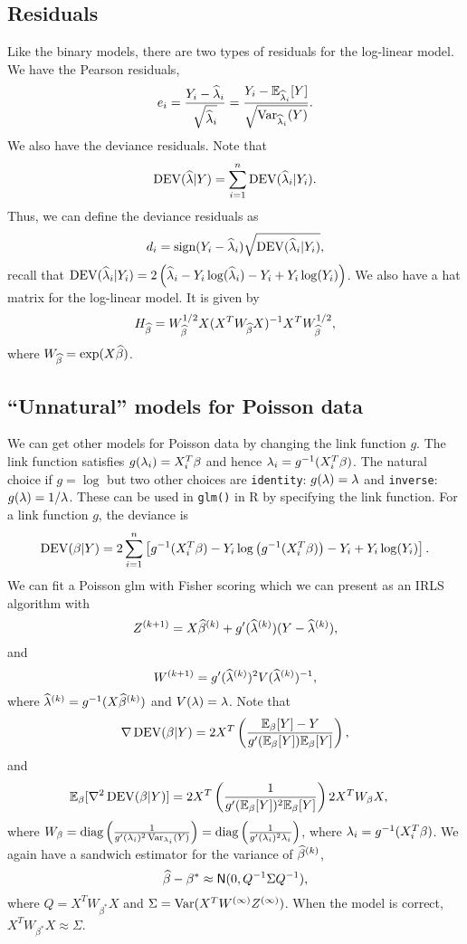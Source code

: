 {\subsection{Residuals}
Like the binary models, there are two types of residuals for the log-linear model. We have the Pearson residuals,
\[e_i = \frac{Y_i-\widehat{\lambda}_i}{\sqrt{\widehat{\lambda}_i}} = \frac{Y_i - {\mathbb{E}}_{\widehat{\lambda}_i}[Y]}{\sqrt{\operatorname{Var}_{\widehat{\lambda}_i}(Y)}}. \]
We also have the deviance residuals. Note that
\[\operatorname{DEV}(\widehat{\lambda}|Y) = \sum_{i=1}^n \operatorname{DEV}(\widehat{\lambda}_i|Y_i). \]
Thus, we can define the deviance residuals as 
\[d_i = \text{sign}(Y_i - \widehat{\lambda}_i)\sqrt{\operatorname{DEV}(\widehat{\lambda}_i|Y_i)}, \]
recall that $\operatorname{DEV}(\widehat{\lambda}_i|Y_i) = 2\left(\widehat{\lambda}_i-Y_i\log(\widehat{\lambda}_i)-Y_i+Y_i\log(Y_i)\right)$. We also have a hat matrix for the log-linear model. It is given by
\[H_{\widehat{\beta}} = W_{\widehat{\beta}}^{1/2}X(X^TW_{\widehat{\beta}}X)^{-1}X^TW_{\widehat{\beta}}^{1/2}, \]
where $W_{\widehat{\beta}}=\exp(X\widehat{\beta})$.
\subsection{``Unnatural'' models for Poisson data}
We can get other models for Poisson data by changing the link function $g$. The link function satisfies $g(\lambda_i) = X_i^T\beta$ and hence $\lambda_i = g^{-1}(X_i^T\beta)$. The natural choice if $g = \log$ but two other choices are \texttt{identity}: $g(\lambda) = \lambda$ and \texttt{inverse}: $g(\lambda) = 1/\lambda$. These can be used in \texttt{glm()} in R by specifying the link function. For a link function $g$, the deviance is
\[\operatorname{DEV}(\beta|Y) = 2\sum_{i=1}^n \left[g^{-1}(X_i^T\beta)-Y_i\log\left(g^{-1}(X_i^T\beta)\right)-Y_i + Y_i\log(Y_i)\right].\]
We can fit a Poisson glm with Fisher scoring which we can present as an IRLS algorithm with
\[Z^{(k+1)} = X\widehat{\beta}^{(k)}+g'(\widehat{\lambda}^{(k)})(Y-\widehat{\lambda}^{(k)}), \]
and 
\[W^{(k+1)} = g'(\widehat{\lambda}^{(k)})^2 V(\widehat{\lambda}^{(k)})^{-1}, \]
where $\widehat{\lambda}^{(k)} = g^{-1}(X\widehat{\beta}^{(k)})$ and $V(\lambda) = \lambda$. Note that 
\[\nabla \operatorname{DEV}(\beta|Y) = 2X^T\left(\frac{{\mathbb{E}}_{\beta}[Y]-Y}{g'({\mathbb{E}}_{\beta}[Y]){\mathbb{E}}_{\beta}[Y]}\right),\]
and 
\begin{align*}
    {\mathbb{E}}_\beta[\nabla^2 \operatorname{DEV}(\beta|Y)]&=2X^T\left(\frac{1}{g'({\mathbb{E}}_{\beta}[Y])^2{\mathbb{E}}_{\beta}[Y]}\right)
    2X^TW_\beta X,
\end{align*}
where $W_\beta = \operatorname{diag}\left(\frac{1}{g'(\lambda_i)^2\operatorname{Var}_{\lambda_i}(Y)}\right)=\operatorname{diag}\left(\frac{1}{g'(\lambda_i)^2\lambda_i}\right)$, where $\lambda_i = g^{-1}(X_i^T\beta)$. We again have a sandwich estimator for the variance of $\widehat{\beta}^{(k)}$,
\[\widehat{\beta}-\beta^* \approx \mathsf{N}(0, Q^{-1}\Sigma Q^{-1}),\]
where $Q = X^TW_{\beta^*} X$ and $\Sigma = \operatorname{Var}(X^TW^{(\infty)}Z^{(\infty)})$. When the model is correct, $X^TW_{\beta^*}X \approx \Sigma$. 
}
